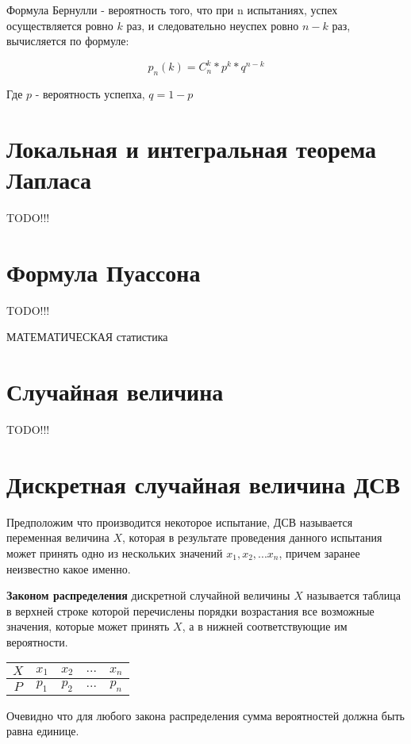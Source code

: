 \documentclass[a4paper]{article}
\begin{document}
Формула Бернулли - вероятность того, что при n испытаниях, успех осуществляется ровно $k$ раз, и следовательно неуспех ровно $n - k$ раз, вычисляется по формуле:

$$ p_n(k) = C_n^k*p^k*q^{n-k}$$

Где $p$ - вероятность успепха, $q = 1 - p$

\section{Локальная и интегральная теорема Лапласа}

TODO!!!

\section{Формула Пуассона}

TODO!!!


МАТЕМАТИЧЕСКАЯ статистика

\section{Случайная величина}

TODO!!!

\section{Дискретная случайная величина ДСВ}
Предположим что производится некоторое испытание, ДСВ называется переменная величина $X$, которая в результате проведения данного испытания может принять одно из нескольких значений $x_1, x_2, ... x_n$, причем заранее неизвестно какое именно.

\textbf{Законом распределения} дискретной случайной величины $X$ называется таблица в верхней строке которой перечислены порядки возрастания все возможные значения, которые может принять $X$, а в нижней соответствующие им вероятности.

\begin{table}[ht]
\centering
\begin{tabular}{|c|c|c|c|c|}
\hline
$X$ & $x_1$ & $x_2$ & $...$ & $x_n$ \\
\hline
$P$ & $p_1$ & $p_2$ & $...$ & $p_n$ \\
\hline
\end{tabular}
\end{table}

Очевидно что для любого закона распределения сумма вероятностей должна быть равна единице.
\end{document}
